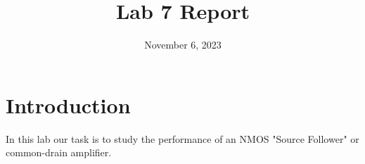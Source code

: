 \documentclass{article}
\title{Lab 7 Report}
\date{November 6, 2023}
\begin{document}
\maketitle
\section{Introduction}

In this lab our task is to study the performance of
an NMOS "Source Follower" or common-drain amplifier.
\end{document}
